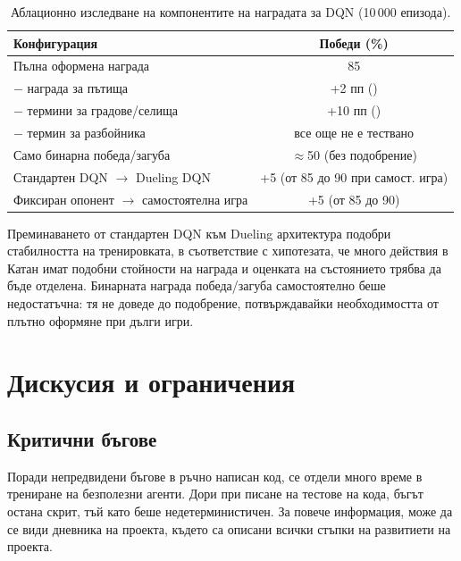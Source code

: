 \documentclass[11pt,a4paper]{article}
\begin{document}
\begin{table}[h]
\centering
\caption{Аблационно изследване на компонентите на наградата за DQN (10\,000 епизода).}
\label{tab:ablation}
\begin{tabular}{lc}
\toprule
Конфигурация & Победи (\%) \\
\midrule
Пълна оформена награда                           & 85 \\
\quad $-$ награда за пътища                      & +2 пп () \\
\quad $-$ термини за градове/селища              & +10 пп () \\
\quad $-$ термин за разбойника                   & все още не е тествано \\
Само бинарна победа/загуба                       & $\approx$50 (без подобрение) \\
Стандартен DQN $\to$ Dueling DQN                 & +5 (от 85 до 90 при самост. игра) \\
Фиксиран опонент $\to$ самостоятелна игра        & +5 (от 85 до 90) \\
\bottomrule
\end{tabular}
\end{table}

Преминаването от стандартен DQN към Dueling архитектура подобри стабилността
на тренировката, в съответствие с хипотезата, че много действия в Катан имат
подобни стойности на награда и оценката на състоянието трябва
да бъде отделена. Бинарната награда победа/загуба самостоятелно беше
недостатъчна: тя не доведе до подобрение, потвърждавайки необходимостта от плътно оформяне при дълги игри.

\section{Дискусия и ограничения}
\label{sec:bugs}

\subsection{Критични бъгове}

Поради непредвидени бъгове в ръчно написан код, се отдели много време в трениране на безполезни агенти. Дори при писане на тестове на кода, бъгът остана скрит, тъй като беше недетерминистичен. За повече информация, може да се види дневника на проекта, където са описани всички стъпки на развитиети на проекта.
\end{document}
